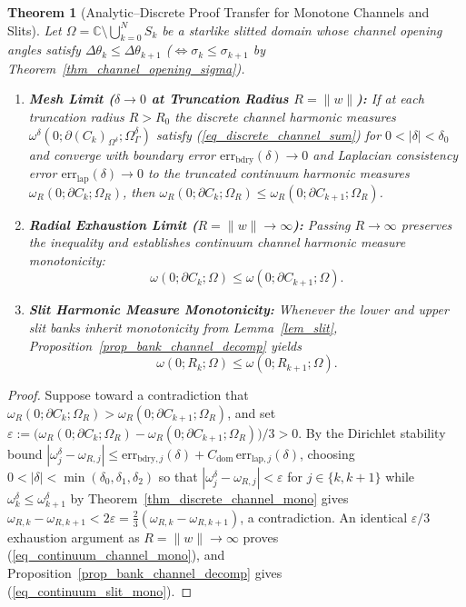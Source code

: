\documentclass[11pt,reqno]{amsart}
\newtheorem{thm}{Theorem}[section]
\numberwithin{equation}{section}
\newcommand{\C}{\mathbb{C}}
\newcommand{\eps}{\varepsilon}
\begin{document}
\begin{thm}[Analytic--Discrete Proof Transfer for Monotone Channels and Slits] \label{thm_analytic_discrete_transfer}
Let $\varOmega = \C \setminus \bigcup_{k=0}^N S_k$ be a starlike slitted domain whose channel opening angles satisfy $\Delta\theta_k \le \Delta\theta_{k+1}$ ($\iff \sigma_k \le \sigma_{k+1}$ by Theorem~\ref{thm_channel_opening_sigma}).
\begin{enumerate}
\item \textbf{Mesh Limit ($\delta \to 0$ at Truncation Radius $R = \|w\|$):} If at each truncation radius $R > R_0$ the discrete channel harmonic measures $\omega^{\delta}(0; \partial(C_k)_{\Omega^{\delta}}; \varOmega^{\delta}_{\varGamma})$ satisfy (\ref{eq_discrete_channel_sum}) for $0 < |\delta| < \delta_0$ and converge with boundary error $\text{err}_{\text{bdry}}(\delta) \to 0$ and Laplacian consistency error $\text{err}_{\text{lap}}(\delta) \to 0$ to the truncated continuum harmonic measures $\omega_R(0; \partial C_k; \varOmega_R)$, then $\omega_R(0; \partial C_k; \varOmega_R) \le \omega_R(0; \partial C_{k+1}; \varOmega_R)$.
\item \textbf{Radial Exhaustion Limit ($R = \|w\| \to \infty$):} Passing $R \to \infty$ preserves the inequality and establishes continuum channel harmonic measure monotonicity:
\begin{equation} \label{eq_continuum_channel_mono}
  \omega(0; \partial C_k; \varOmega) \le \omega(0; \partial C_{k+1}; \varOmega).
\end{equation}
\item \textbf{Slit Harmonic Measure Monotonicity:} Whenever the lower and upper slit banks inherit monotonicity from Lemma~\ref{lem_slit}, Proposition~\ref{prop_bank_channel_decomp} yields
\begin{equation} \label{eq_continuum_slit_mono}
  \omega(0; R_k; \varOmega) \le \omega(0; R_{k+1}; \varOmega).
\end{equation}
\end{enumerate}
\end{thm}
\begin{proof}
Suppose toward a contradiction that $\omega_R(0; \partial C_k; \varOmega_R) > \omega_R(0; \partial C_{k+1}; \varOmega_R)$, and set $\eps := \bigl(\omega_R(0; \partial C_k; \varOmega_R) - \omega_R(0; \partial C_{k+1}; \varOmega_R)\bigr)/3 > 0$. By the Dirichlet stability bound $|\omega^{\delta}_j - \omega_{R,j}| \le \text{err}_{\text{bdry},j}(\delta) + C_{\text{dom}}\,\text{err}_{\text{lap},j}(\delta)$, choosing $0 < |\delta| < \min(\delta_0, \delta_1, \delta_2)$ so that $|\omega^{\delta}_j - \omega_{R,j}| < \eps$ for $j \in \{k, k+1\}$ while $\omega^{\delta}_k \le \omega^{\delta}_{k+1}$ by Theorem~\ref{thm_discrete_channel_mono} gives $\omega_{R,k} - \omega_{R,k+1} < 2\eps = \frac{2}{3}(\omega_{R,k} - \omega_{R,k+1})$, a contradiction. An identical $\eps/3$ exhaustion argument as $R = \|w\| \to \infty$ proves (\ref{eq_continuum_channel_mono}), and Proposition~\ref{prop_bank_channel_decomp} gives (\ref{eq_continuum_slit_mono}).
\end{proof}
\end{document}
